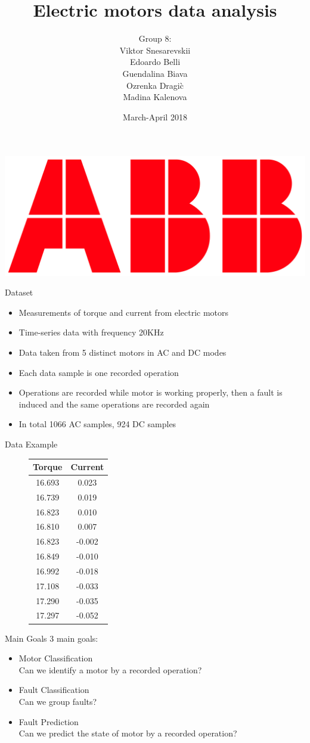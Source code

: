 \documentclass[9pt]{beamer}
\title[Electric motors data analysis]{\huge Electric motors data analysis}
\author[Snesarevskii, Belli, Biava, Dragi\`c, Kalenova] {{\Large Group 8:\\}Viktor Snesarevskii\\Edoardo Belli\\Guendalina Biava\\Ozrenka Dragi\`c\\Madina Kalenova}
\date{March-April 2018}
\begin{document}
	\begin{frame}
	\titlepage
	\vfill
	\begin{flushright}
		\includegraphics[height=.7cm]{abb.png}
	\end{flushright}
\end{frame}
\begin{frame}{Dataset}
\begin{itemize} %
\item Measurements of torque and current from electric motors
\item Time-series data with frequency 20KHz
\item Data taken from 5 distinct motors in AC and DC modes
\item Each data sample is one recorded operation
\item Operations are recorded while motor is working properly, then a fault is induced and the same operations are recorded again 
\item In total 1066 AC samples, 924 DC samples
\end{itemize}
\end{frame}
\begin{frame}{Data Example}
\begin{figure}\centering
\begin{tabular}{|c|c|}\hline
\textbf{Torque} & \textbf{Current} \\\hline
16.693&0.023\\\hline
16.739&0.019\\\hline
16.823&0.010\\\hline
16.810&0.007\\\hline
16.823&-0.002\\\hline
16.849&-0.010\\\hline
16.992&-0.018\\\hline
17.108&-0.033\\\hline
17.290&-0.035\\\hline
17.297&-0.052\\\hline
\end{tabular}\end{figure}
\end{frame}
\begin{frame}{Main Goals}
3 main goals:
\begin{itemize} %
\item {\large Motor Classification}\\
Can we identify a motor by a recorded operation?
\item {\large Fault Classification}\\
Can we group faults?
\item {\large Fault Prediction}\\
Can we predict the state of motor by a recorded operation?
\end{itemize}
\end{frame}
\end{document}
